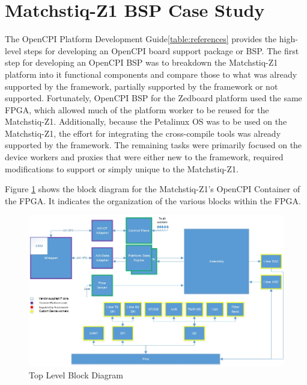 \section{Matchstiq-Z1 BSP Case Study}
The OpenCPI Platform Development Guide\ref{table:references} provides the high-level steps for developing an OpenCPI board support package or BSP. The first step for developing an OpenCPI BSP was to breakdown the Matchstiq-Z1 platform into it functional components and compare those to what was already supported by the framework, partially supported by the framework or not supported. Fortunately, OpenCPI BSP for the Zedboard platform used the same FPGA, which allowed much of the platform worker to be reused for the Matchstiq-Z1. Additionally, because the Petalinux OS was to be used on the Matchstiq-Z1, the effort for integrating the cross-compile tools was already supported by the framework. The remaining tasks were primarily focused on the device workers and proxies that were either new to the framework, required modifications to support or simply unique to the Matchstiq-Z1.\\ \par\medskip

\noindent Figure \ref{fig:toplevel} shows the block diagram for the Matchstiq-Z1's OpenCPI Container of the FPGA. It indicates the organization of the various blocks within the FPGA.
    \begin{figure}[H]
      \centerline{\includegraphics[scale=0.65]{matchstiq_BSP_toplevel}}
      \caption{Top Level Block Diagram}
      \label{fig:toplevel}
    \end{figure}

